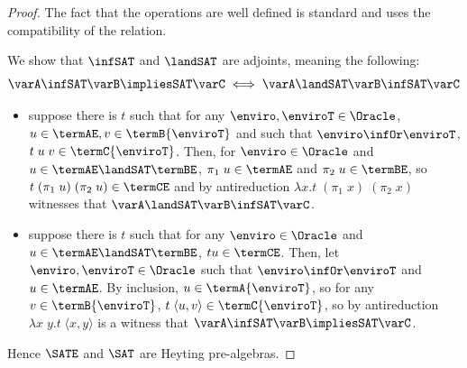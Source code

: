 \begin{proof}%
  The fact that the operations are well defined is standard and uses the compatibility of the relation.


  We show that $\infSAT$ and $\landSAT$ are adjoints, meaning the following:
  \[\varA \infSAT \varB \impliesSAT \varC \iff \varA\landSAT \varB\infSAT \varC\]
  \begin{itemize}
  \item suppose there is $t$ such that for any $\enviro,\enviroT\in\Oracle$, $u \in \termAE, v \in \termB{\enviroT}$ and such that $\enviro \infOr \enviroT$, $t\;u\;v \in \termC{\enviroT}$. Then, for $\enviro \in \Oracle$ and $u \in \termAE\landSAT\termBE$, $\pi_1\;u\in\termAE$ and $\pi_2\;u\in\termBE$, so $t\;(\pi_1\;u)\;(\pi_2\;u)\in\termCE$ and by antireduction $\lambda x.t\;(\pi_1\;x)\;(\pi_2\;x)$ witnesses that $\varA \landSAT \varB \infSAT \varC$.
  \item suppose there is $t$ such that for any $\enviro\in\Oracle$ and $u \in \termAE \landSAT \termBE$, $tu \in \termCE$. Then, let $\enviro,\enviroT\in\Oracle$ such that $\enviro\infOr \enviroT$ and $u \in \termAE$. By inclusion, $u \in \termA{\enviroT}$, so for any $v \in \termB{\enviroT}$, $t\;\langle u,v\rangle \in \termC{\enviroT}$, so by antireduction $\lambda x\;y.t\;\langle x,y\rangle$ is a witness that $\varA\infSAT \varB \impliesSAT \varC$.
  \end{itemize}

  Hence $\SATE$ and $\SAT$ are Heyting pre-algebras.
\end{proof}


